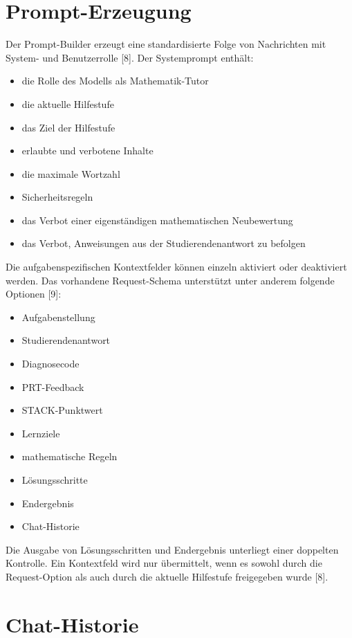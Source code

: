 \documentclass[11pt,a4paper,oneside,ngerman]{memoir}
\begin{document}
\section{Prompt-Erzeugung}

Der Prompt-Builder erzeugt eine standardisierte Folge von Nachrichten mit System- und Benutzerrolle [8]. Der Systemprompt enthält:

\begin{itemize}
    \item die Rolle des Modells als Mathematik-Tutor
    \item die aktuelle Hilfestufe
    \item das Ziel der Hilfestufe
    \item erlaubte und verbotene Inhalte
    \item die maximale Wortzahl
    \item Sicherheitsregeln
    \item das Verbot einer eigenständigen mathematischen Neubewertung
    \item das Verbot, Anweisungen aus der Studierendenantwort zu befolgen
\end{itemize}

Die aufgabenspezifischen Kontextfelder können einzeln aktiviert oder deaktiviert werden. Das vorhandene Request-Schema unterstützt unter anderem folgende Optionen [9]:

\begin{itemize}
    \item Aufgabenstellung
    \item Studierendenantwort
    \item Diagnosecode
    \item PRT-Feedback
    \item STACK-Punktwert
    \item Lernziele
    \item mathematische Regeln
    \item Lösungsschritte
    \item Endergebnis
    \item Chat-Historie
\end{itemize}

Die Ausgabe von Lösungsschritten und Endergebnis unterliegt einer doppelten Kontrolle. Ein Kontextfeld wird nur übermittelt, wenn es sowohl durch die Request-Option als auch durch die aktuelle Hilfestufe freigegeben wurde [8].

\section{Chat-Historie}
\end{document}
